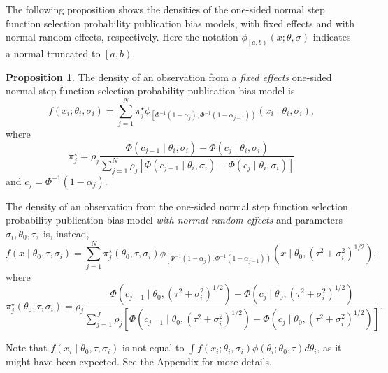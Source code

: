 \documentclass{article}
\theoremstyle{plain}
\theoremstyle{definition}
\newtheorem{prop}[theorem]{Proposition}
\renewcommand{\sqrt}[1]{(#1)^{1/2}}
\begin{document}
The following proposition shows the densities of the one-sided normal step function selection probability publication bias models, with fixed effects and with normal random effects, respectively. Here the notation $\phi_{\left[a,b\right)}\left(x;\theta,\sigma\right)$ indicates a normal truncated to $\left[a,b\right)$.
\begin{prop}
\label{prop:One-sided normal discrete probability vector publication bias model-1}
The density of an observation from a \emph{fixed effects} one-sided normal step function selection probability publication bias model is
\begin{equation}\label{eq:Fixed effects, publication bias}
f\left(x_{i};\theta_{i},\sigma_{i}\right) = \sum_{j=1}^{N}\pi_{j}^\star\phi_{\left[\Phi^{-1}\left(1-\alpha_{j}\right),\Phi^{-1}\left(1-\alpha_{j-1}\right)\right)}\left(x_{i}\mid\theta_{i},\sigma_{i}\right),
\end{equation}
where
$$
\pi_{j}^{\star}=\rho_{j}\frac{\Phi\left(c_{j-1}\mid\theta_{i},\sigma_{i}\right)-\Phi\left(c_{j}\mid\theta_{i},\sigma_{i}\right)}{\sum_{j=1}^{N}\rho_{j}\left[\Phi\left(c_{j-1}\mid\theta_{i},\sigma_{i}\right)-\Phi\left(c_{j}\mid\theta_{i},\sigma_{i}\right)\right]}
$$
and $c_{j}=\Phi^{-1}\left(1-\alpha_{j}\right)$.

The density of an observation from the one-sided normal step function selection probability publication bias model \emph{with normal random effects} and parameters $\sigma_{i},\theta_{0},\tau,$ is, instead,
\begin{equation}\label{eq:Random effects, publication bias}
f\left(x\mid\theta_{0},\tau,\sigma_{i}\right)=\sum_{j=1}^{N}\pi_{j}^{\star}\left(\theta_0,\tau,\sigma_{i}\right)\phi_{\left[\Phi^{-1}\left(1-\alpha_{j}\right),\Phi^{-1}\left(1-\alpha_{j-1}\right)\right)}\left(x\mid\theta_{0},\sqrt{\tau^{2}+\sigma_{i}^{2}}\right),
\end{equation}
where 
\[
\pi_{j}^{\star}\left(\theta_0,\tau,\sigma_{i}\right)=\rho_{j}\frac{\Phi\left(c_{j-1}\mid\theta_{0},\sqrt{\tau^{2}+\sigma_{i}^{2}}\right)-\Phi\left(c_{j}\mid\theta_{0},\sqrt{\tau^{2}+\sigma_{i}^{2}}\right)}{\sum_{j=1}^{J}\rho_{j}\left[\Phi\left(c_{j-1}\mid\theta_{0},\sqrt{\tau^{2}+\sigma_{i}^{2}}\right)-\Phi\left(c_{j}\mid\theta_{0},\sqrt{\tau^{2}+\sigma_{i}^{2}}\right)\right]}.
\]
\end{prop}

Note that $f\left(x_i\mid\theta_{0},\tau,\sigma_i\right)$ is not equal to $\int f\left(x_{i};\theta_{i},\sigma_{i}\right)\phi\left(\theta_{i};\theta_{0},\tau\right)d\theta_{i}$,
as it might have been expected. See the Appendix for more details.
\end{document}
